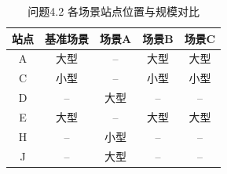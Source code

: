 \begin{table}[htbp]
\centering
\caption{问题4.2 各场景站点位置与规模对比}
\begin{tabular}{|c|c|c|c|c|}
\hline
站点 & 基准场景 & 场景A & 场景B & 场景C \\
\hline
A & 大型 & -- & 大型 & 大型 \\
C & 小型 & -- & 小型 & 小型 \\
D & -- & 大型 & -- & -- \\
E & 大型 & -- & 大型 & 大型 \\
H & -- & 小型 & -- & -- \\
J & -- & 大型 & -- & -- \\
\hline
\end{tabular}
\end{table}
